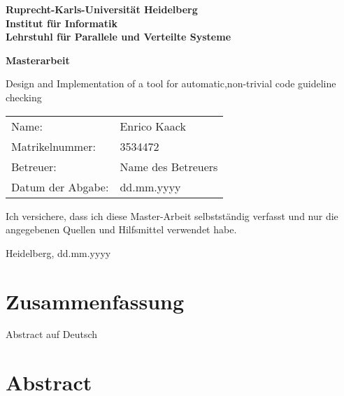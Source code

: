 \documentclass[
     12pt,                    %
     a4paper,             %
     BCOR10mm,     %
     DIV14,                 %
     listof=totoc,                    %
     bibliography=totoc,       %
     index=totoc,              %
     twoside,
     headsepline
     ]{scrreprt}
\begin{document}
\begin{titlepage}


\vspace*{1cm}
\begin{center}
\vspace*{3cm}
\textbf{ 
\Large Ruprecht-Karls-Universität Heidelberg\\
\smallskip
\Large Institut für Informatik\\
\smallskip
\Large Lehrstuhl für Parallele und Verteilte Systeme\\
\smallskip
}

\vspace{3cm}

\textbf{\large Masterarbeit} 

\vspace{0.5\baselineskip}
{\huge
Design and Implementation of a tool for automatic,non-trivial code guideline checking
}
\end{center}

\vfill 

{\large
\begin{tabular}[l]{ll}
Name: & Enrico Kaack\\
Matrikelnummer: & 3534472\\
Betreuer: & Name des Betreuers\\
Datum der Abgabe: & dd.mm.yyyy
\end{tabular}
}

\end{titlepage}

\onehalfspacing

\thispagestyle{empty}

\vspace*{100pt}
\noindent
Ich versichere, dass ich diese Master-Arbeit selbstständig verfasst und nur die angegebenen
Quellen und Hilfsmittel verwendet habe.

\vspace*{50pt}

\noindent
Heidelberg, dd.mm.yyyy
\cleardoublepage

\section*{Zusammenfassung}

Abstract auf Deutsch

\section*{Abstract}
\end{document}
